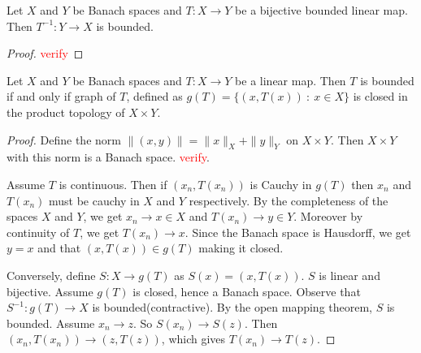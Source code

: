 \begin{corollary}
  Let $X$ and $Y$ be Banach spaces and $T: X \to Y$ be a bijective
  bounded linear map. Then $T^{-1}: Y \to X$ is bounded.
\end{corollary}
\begin{proof}
  \textcolor{red}{verify}
\end{proof}

\begin{theorem}
  Let $X$ and $Y$ be Banach spaces and $T: X \to Y$ be a linear map.
  Then $T$ is bounded if and only if graph of $T$, defined as $g(T) =
  \{ (x, T(x)) \ : \ x \in X \}$ is closed in the product topology of
  $ X \times Y$.
\end{theorem}
\begin{proof}
  Define the norm $\|(x, y)\| = \|x\|_X + \|y\|_Y$ on $X \times Y$.
  Then $ X \times Y $ with this norm is a Banach space. \textcolor{red}{verify}.

  Assume $T$ is continuous. Then if $(x_n, T(x_n))$ is Cauchy in
  $g(T)$ then $x_n$ and $T(x_n)$ must be cauchy in $X$ and $Y$
  respectively. By the completeness of the spaces $X$ and $Y$, we get
  $x_n \to x \in X$ and $T( x_n) \to y \in Y$. Moreover by continuity
  of $T$, we get $T(x_n) \to x$. Since the Banach space is Hausdorff,
  we get $y = x$ and that $(x, T(x)) \in g(T)$ making it closed.

  Conversely,  define $S: X \to g(T)$ as $S(x) = (x, T(x))$. $S$ is
  linear and bijective. Assume $ g(T)$ is closed, hence a Banach space.
  Observe that $S^{-1}: g(T) \to X$ is bounded(contractive). By the
  open mapping theorem, $S$ is bounded. Assume $x_n \to z$. So
  $S(x_n) \to S(z)$. Then $(x_n, T(x_n)) \to (z, T(z))$, which gives
  $  T(x_n ) \to T(z)$.
\end{proof}
